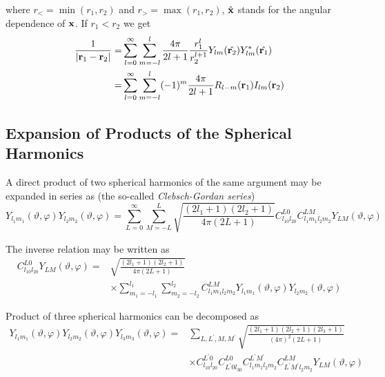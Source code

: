 where $r_<=\min (r_1,r_2)$ and $r_>=\max (r_1,r_2)$, $\hat{\bf x}$ stands for
the angular dependence of ${\bf x}$. If $r_1<r_2$ we get
\begin{equation}
\begin{split}
\frac{1}{|{\bf r}_1-{\bf r}_2|}=&\sum_{l=0}^{\infty}\sum_{m=-l}^{l}\frac{4 \pi}{2l+1}\frac{r_1^l}{r_2^{l+1}}Y_{lm}(\hat{{\bf r}_2})Y_{lm}^{*}(\hat{{\bf r}_1})\\=&\sum_{l=0}^{\infty}\sum_{m=-l}^{l}(-1)^m\frac{4 \pi}{2l+1}R_{l-m}({\bf r}_1)I_{lm}({\bf r}_2)
\end{split}
\end{equation}
%
\subsection[Expansion of Products...]{Expansion of Products of the Spherical Harmonics}
\par{A direct product of two spherical harmonics of the same argument may be
  expanded in series as (the so-called {\it Clebsch-Gordan series})}
\begin{equation}
\label{product2}
Y_{l_1m_1}(\vartheta,\varphi)Y_{l_2m_2}(\vartheta,\varphi)=\sum_{L=0}^{\infty}\sum_{M=-L}^{L}\sqrt{\frac{(2l_1+1)(2l_2+1)}{4\pi(2L+1)}}C_{l_10l_20}^{L0}C_{l_1m_1l_2m_2}^{LM}Y_{LM}(\vartheta,\varphi)
\end{equation}
\par{The inverse relation may be written as}
\begin{equation}
\begin{split}
C_{l_10l_20}^{L0}Y_{LM}(\vartheta,\varphi)=&\sqrt{\frac{(2l_1+1)(2l_2+1)}{4\pi(2L+1)}}\\&\times\sum_{m_1=-l_1}^{l_1}\sum_{m_2=-l_2}^{l_2}C_{l_1m_1l_2m_2}^{LM}Y_{l_1m_1}(\vartheta,\varphi)Y_{l_2m_2}(\vartheta,\varphi)
\end{split}
\end{equation}
\par{Product of three spherical harmonics can be decomposed as}
\begin{equation}
\begin{split}
Y_{l_1m_1}(\vartheta,\varphi)Y_{l_2m_2}(\vartheta,\varphi)Y_{l_3m_3}(\vartheta,\varphi)=&\sum_{L,L^{\prime},M,M^{\prime}}\sqrt{\frac{(2l_1+1)(2l_2+1)(2l_3+1)}{(4\pi)^2(2L+1)}}\\&\times C_{l_10l_20}^{L^{\prime}0}C_{L^{\prime}0l_30}^{L0}
C_{l_1m_1l_2m_2}^{L^{\prime}M^{\prime}}C_{L^{\prime}M^{\prime}l_2m_2}^{LM}Y_{LM}(\vartheta,\varphi)
\end{split}
\end{equation}
